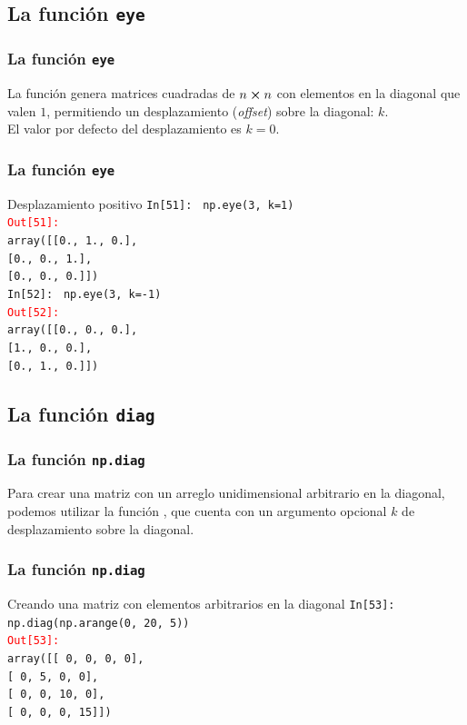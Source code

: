 \subsection{La función \texttt{eye}}
\begin{frame}[fragile]
\frametitle{La función \texttt{eye}}
La función  genera matrices cuadradas de $n \cp n$ con elementos en la diagonal que valen $1$, permitiendo un desplazamiento (\emph{offset}) sobre la diagonal: $k$.
\\
\bigskip
El valor por defecto del desplazamiento es $k=0$.
\end{frame}
\begin{frame}[fragile]
\frametitle{La función \texttt{eye}}
\fontsize{12}{12}\selectfont
\begin{exampleblock}{Desplazamiento positivo}
\textcolor{ao}{\texttt{In[51]: }} \texttt{np.eye(3, k=1)} \\
\medskip
\pause
\textcolor{red}{\texttt{Out[51]: }} \\
\texttt{array([[0., 1., 0.],} \\
\texttt{[0., 0., 1.],} \\
\texttt{[0., 0., 0.]])} \\
\medskip
\pause
\textcolor{ao}{\texttt{In[52]: }} \texttt{np.eye(3, k=-1)} \\
\medskip
\pause
\textcolor{red}{\texttt{Out[52]: }} \\
\texttt{array([[0., 0., 0.],} \\
\texttt{[1., 0., 0.],} \\
\texttt{[0., 1., 0.]])}
\end{exampleblock}
\end{frame}
\subsection{La función \texttt{diag}}
\begin{frame}[fragile]
\frametitle{La función \texttt{np.diag}}
Para crear una matriz con un arreglo unidimensional arbitrario en la diagonal, podemos utilizar la función , que cuenta con un argumento opcional $k$ de desplazamiento sobre la diagonal.
\end{frame}
\begin{frame}[fragile]
\frametitle{La función \texttt{np.diag}}
\fontsize{12}{12}\selectfont
\begin{exampleblock}{Creando una matriz con elementos arbitrarios en la diagonal}
\textcolor{ao}{\texttt{In[53]: }} \texttt{np.diag(np.arange(0, 20, 5))} \\
\medskip
\pause
\textcolor{red}{\texttt{Out[53]: }} \\
\texttt{array([[ 0,  0,  0,  0],} \\
\texttt{[ 0,  5,  0,  0],} \\
\texttt{[ 0,  0, 10,  0],} \\
\texttt{[ 0,  0,  0, 15]])}
\end{exampleblock}
\end{frame}
